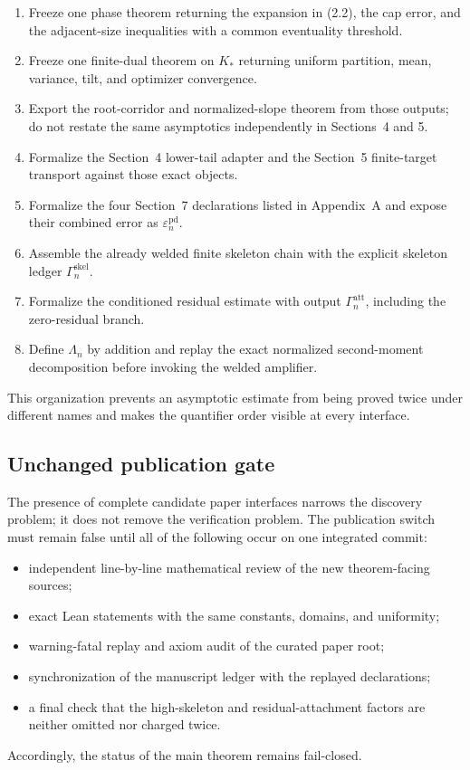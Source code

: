 \begin{enumerate}
\item Freeze one phase theorem returning the expansion in (2.2), the cap error,
and the adjacent-size inequalities with a common eventuality threshold.
\item Freeze one finite-dual theorem on $K_*$ returning uniform partition,
mean, variance, tilt, and optimizer convergence.
\item Export the root-corridor and normalized-slope theorem from those outputs;
do not restate the same asymptotics independently in Sections~4 and 5.
\item Formalize the Section~4 lower-tail adapter and the Section~5 finite-target
transport against those exact objects.
\item Formalize the four Section~7 declarations listed in Appendix~A and expose
their combined error as $\varepsilon_n^{\mathrm{pd}}$.
\item Assemble the already welded finite skeleton chain with the explicit
skeleton ledger $\Gamma_n^{\mathrm{skel}}$.
\item Formalize the conditioned residual estimate with output
$\Gamma_n^{\mathrm{att}}$, including the zero-residual branch.
\item Define $\Lambda_n$ by addition and replay the exact normalized
second-moment decomposition before invoking the welded amplifier.
\end{enumerate}

This organization prevents an asymptotic estimate from being proved twice
under different names and makes the quantifier order visible at every
interface.

\subsection{Unchanged publication gate}

The presence of complete candidate paper interfaces narrows the discovery
problem; it does not remove the verification problem. The publication switch
must remain false until all of the following occur on one integrated commit:

\begin{itemize}
\item independent line-by-line mathematical review of the new theorem-facing
sources;
\item exact Lean statements with the same constants, domains, and uniformity;
\item warning-fatal replay and axiom audit of the curated paper root;
\item synchronization of the manuscript ledger with the replayed declarations;
\item a final check that the high-skeleton and residual-attachment factors are
neither omitted nor charged twice.
\end{itemize}

Accordingly, the status of the main theorem remains fail-closed.